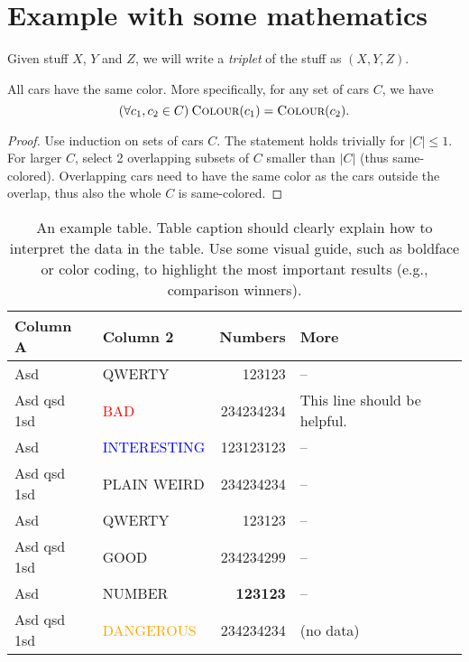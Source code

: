 \section{Example with some mathematics}
\label{sec:demo}

\begin{defn}[Triplet]\label{defn:x}
Given stuff $X$, $Y$ and $Z$, we will write a \emph{triplet} of the stuff as $(X,Y,Z)$.
\end{defn}

\newcommand{\Col}{\textsc{Colour}}

\begin{thm}\label{thm:y}
All cars have the same color. More specifically, for any set of cars $C$, we have
$$(\forall c_1, c_2 \in C)\:\Col(c_1) = \Col(c_2).$$
\end{thm}

\begin{proof}
Use induction on sets of cars $C$. The statement holds trivially for $|C|\leq1$. For larger $C$, select 2 overlapping subsets of $C$ smaller than $|C|$ (thus same-colored). Overlapping cars need to have the same color as the cars outside the overlap, thus also the whole $C$ is same-colored.
\end{proof}

\begin{table}
\centering\footnotesize\sf
\begin{tabular}{llrl}
\toprule
Column A & Column 2 & Numbers & More \\
\midrule
Asd & QWERTY & 123123 & -- \\
Asd qsd 1sd & \textcolor{red}{BAD} & 234234234 & This line should be helpful. \\
Asd & \textcolor{blue}{INTERESTING} & 123123123 & -- \\
Asd qsd 1sd & \textcolor{violet!50}{PLAIN WEIRD} & 234234234 & -- \\
Asd & QWERTY & 123123 & -- \\
\addlinespace %
Asd qsd 1sd & \textcolor{green!80!black}{GOOD} & 234234299 & -- \\
Asd & NUMBER & \textbf{123123} & -- \\
Asd qsd 1sd & \textcolor{orange}{DANGEROUS} & 234234234 & (no data) \\
\bottomrule
\end{tabular}
\caption{An example table.  Table caption should clearly explain how to interpret the data in the table. Use some visual guide, such as boldface or color coding, to highlight the most important results (e.g., comparison winners).}
\label{tab:z}
\end{table}

